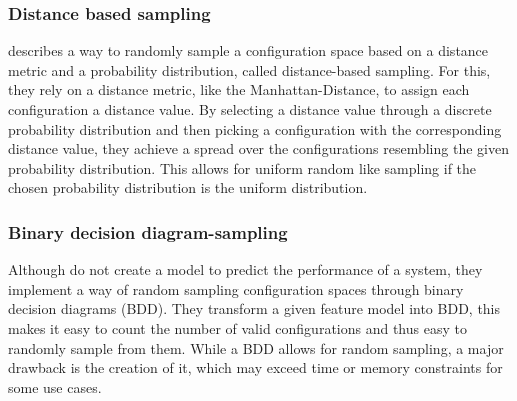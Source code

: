 \documentclass[../../thesis.tex]{subfiles}
\begin{document}
\subsubsection{Distance based sampling}
\citet{kaltenecker2019distance} describes a way to randomly sample a configuration space based on a distance metric
and a probability distribution, called distance-based sampling. For this, they rely on a distance metric, like the
Manhattan-Distance, to assign each configuration a distance value. By selecting a distance value through a
discrete probability distribution and then picking a configuration with the corresponding distance value, they
achieve a spread over the configurations resembling the given probability distribution. This allows for
uniform random like sampling if the chosen probability distribution is the uniform distribution.

\subsubsection{Binary decision diagram-sampling}
Although  do not create a model to predict the performance of a system, they
implement a way of random sampling configuration spaces through binary decision diagrams (BDD)\cite{akers1978binarydecisiondiagram}.
They transform a given feature model into BDD, this makes it easy to count the number of valid configurations
and thus easy to randomly sample from them. While a BDD allows for random sampling, a major drawback is
the creation of it, which may exceed time or memory constraints for some use cases.
\end{document}
